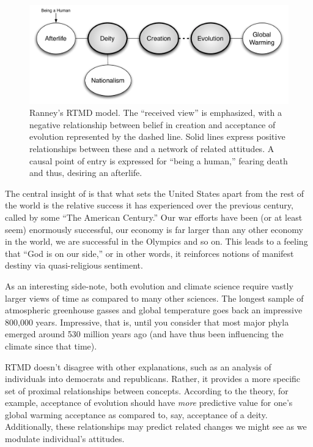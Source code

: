 \begin{figure}[h]
\centering
\includegraphics[width=\textwidth]{rtmd.pdf}
\caption{Ranney's RTMD model. The ``received view'' is emphasized, with
a negative relationship between belief in creation and acceptance of evolution
represented by the dashed line. Solid lines express positive relationships
between these and a network of related attitudes. A causal point of entry is
expressed for ``being a human,'' fearing death and thus, desiring an afterlife.}
\label{fig:rtmd} 
\end{figure}

The central insight of \citeauthor{ranney_accepting_2011} is that what sets the
United States apart from the rest of the world is the relative success it has
experienced over the previous century, called by some ``The American Century.''
Our war efforts have been (or at least seem) enormously successful, our economy
is far larger than any other economy in the world, we are successful in the
Olympics and so on. This leads to a
feeling that ``God is on our side,'' or in other words, it reinforces notions of
manifest destiny via quasi-religious sentiment.


As an interesting side-note, both evolution and climate science require vastly
larger views of time as compared to many other sciences. The longest sample of
atmospheric greenhouse gasses and global temperature goes back an impressive
800,000 years.  Impressive, that is, until you consider that most major phyla
emerged around 530 million years ago (and have thus been influencing the climate
since that time).


RTMD doesn't disagree with other explanations, such as an analysis of
individuals into democrats and republicans. Rather, it provides a more specific
set of proximal relationships between concepts. According to the theory, for
example, acceptance of evolution should have \emph{more} predictive value for
one's global warming acceptance as compared to, say, acceptance of a deity.
Additionally, these relationships may predict related changes we might see as we
modulate individual's attitudes.


